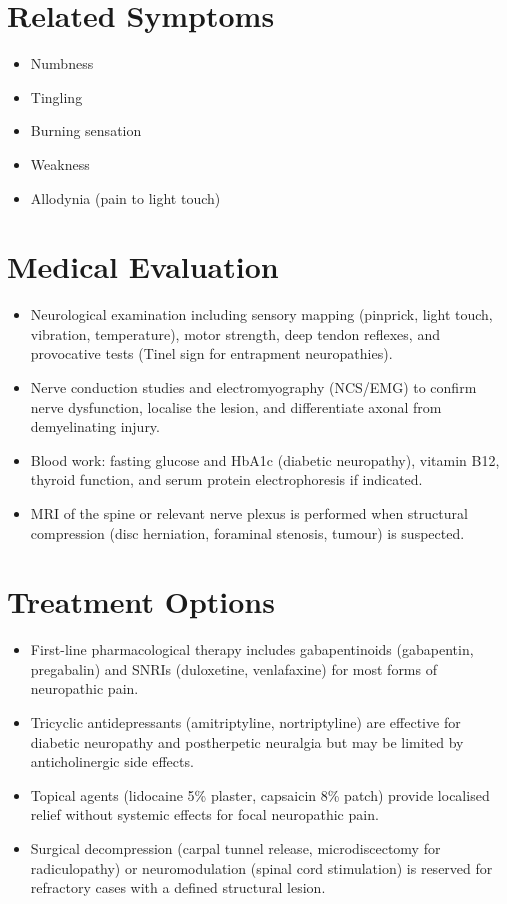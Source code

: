 \section*{Related Symptoms}
\begin{itemize}
  \item Numbness
  \item Tingling
  \item Burning sensation
  \item Weakness
  \item Allodynia (pain to light touch)
\end{itemize}

\section*{Medical Evaluation}
\begin{itemize}
  \item Neurological examination including sensory mapping (pinprick, light touch, vibration, temperature), motor strength, deep tendon reflexes, and provocative tests (Tinel sign for entrapment neuropathies).
  \item Nerve conduction studies and electromyography (NCS/EMG) to confirm nerve dysfunction, localise the lesion, and differentiate axonal from demyelinating injury.
  \item Blood work: fasting glucose and HbA1c (diabetic neuropathy), vitamin B12, thyroid function, and serum protein electrophoresis if indicated.
  \item MRI of the spine or relevant nerve plexus is performed when structural compression (disc herniation, foraminal stenosis, tumour) is suspected.
\end{itemize}

\section*{Treatment Options}
\begin{itemize}
  \item First-line pharmacological therapy includes gabapentinoids (gabapentin, pregabalin) and SNRIs (duloxetine, venlafaxine) for most forms of neuropathic pain.
  \item Tricyclic antidepressants (amitriptyline, nortriptyline) are effective for diabetic neuropathy and postherpetic neuralgia but may be limited by anticholinergic side effects.
  \item Topical agents (lidocaine 5\% plaster, capsaicin 8\% patch) provide localised relief without systemic effects for focal neuropathic pain.
  \item Surgical decompression (carpal tunnel release, microdiscectomy for radiculopathy) or neuromodulation (spinal cord stimulation) is reserved for refractory cases with a defined structural lesion.
\end{itemize}

